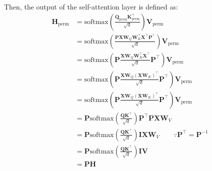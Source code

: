 \begin{parts}
\begin{subparts}
{            Then, the output of the self-attention layer is defined as:
            \begin{align*}
                \mathbf{H}_{\text{perm}}
                &= \text{softmax}(\frac{\mathbf{Q}_{\text{perm}}\mathbf{K}_{\text{perm}}^\top}{\sqrt{d}}) \mathbf{V}_{\text{perm}} \\
                &= \text{softmax}(\frac{\mathbf{PX}\mathbf{W}_Q \mathbf{W}_K^\top \textbf{X}^\top \textbf{P}^\top}{\sqrt{d}}) \mathbf{V}_{\text{perm}} \\
                &= \text{softmax}(\mathbf{P}\frac{\mathbf{X}\mathbf{W}_Q \mathbf{W}_K^\top \mathbf{X}^\top}{\sqrt{d}} \mathbf{P}^\top) \mathbf{V}_{\text{perm}} \\
                &= \text{softmax}(\mathbf{P}\frac{\mathbf{X}\mathbf{W}_Q (\mathbf{X}\mathbf{W}_K)^\top}{\sqrt{d}} \mathbf{P}^\top) \mathbf{V}_{\text{perm}} \\
                &= \text{softmax}(\mathbf{P}\frac{\mathbf{X}\mathbf{W}_Q (\mathbf{X}\mathbf{W}_K)^\top}{\sqrt{d}} \mathbf{P}^\top) \mathbf{V}_{\text{perm}} \\
                &= \mathbf{P} \text{softmax}\left(\frac{\mathbf{Q}\mathbf{K}^{\top}}{\sqrt{d}}\right) \mathbf{P}^\top \mathbf{PX}\mathbf{W}_V \\
                &= \mathbf{P} \text{softmax}\left(\frac{\mathbf{Q}\mathbf{K}^{\top}}{\sqrt{d}}\right) \mathbf{IX}\mathbf{W}_V \quad\quad \because \mathbf{P}^\top = \mathbf{P}^{-1} \\
                &= \mathbf{P} \text{softmax}\left(\frac{\mathbf{Q}\mathbf{K}^{\top}}{\sqrt{d}}\right) \mathbf{IV} \\
                &= \mathbf{PH}
            \end{align*}

}
\end{subparts}
\end{parts}
